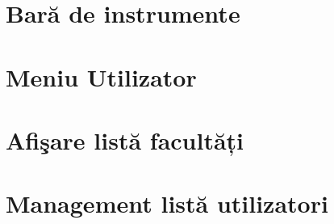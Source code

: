\documentclass[12pt, a4paper, oneside, romanian]{teza-upb}
\begin{document}
\section{Bară de instrumente}
\label{anexabaradeinstrumente}


\section{Meniu Utilizator}
\label{anexameniuutilizator}


\section{Afişare listă facultăți}
\label{anexaafisarelistafacultati}



\section{Management listă utilizatori}
\label{anexalistautilizatori}

\end{document}
